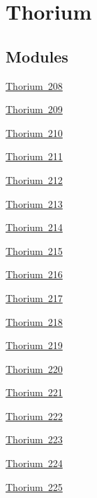 \hypertarget{group___isotope_const-_thorium}{}\section{Thorium}
\label{group___isotope_const-_thorium}
\subsection*{Modules}
\begin{DoxyCompactItemize}
\item 
\mbox{\hyperlink{group___isotope_const-_thorium-_th208}{Thorium 208}}
\item 
\mbox{\hyperlink{group___isotope_const-_thorium-_th209}{Thorium 209}}
\item 
\mbox{\hyperlink{group___isotope_const-_thorium-_th210}{Thorium 210}}
\item 
\mbox{\hyperlink{group___isotope_const-_thorium-_th211}{Thorium 211}}
\item 
\mbox{\hyperlink{group___isotope_const-_thorium-_th212}{Thorium 212}}
\item 
\mbox{\hyperlink{group___isotope_const-_thorium-_th213}{Thorium 213}}
\item 
\mbox{\hyperlink{group___isotope_const-_thorium-_th214}{Thorium 214}}
\item 
\mbox{\hyperlink{group___isotope_const-_thorium-_th215}{Thorium 215}}
\item 
\mbox{\hyperlink{group___isotope_const-_thorium-_th216}{Thorium 216}}
\item 
\mbox{\hyperlink{group___isotope_const-_thorium-_th217}{Thorium 217}}
\item 
\mbox{\hyperlink{group___isotope_const-_thorium-_th218}{Thorium 218}}
\item 
\mbox{\hyperlink{group___isotope_const-_thorium-_th219}{Thorium 219}}
\item 
\mbox{\hyperlink{group___isotope_const-_thorium-_th220}{Thorium 220}}
\item 
\mbox{\hyperlink{group___isotope_const-_thorium-_th221}{Thorium 221}}
\item 
\mbox{\hyperlink{group___isotope_const-_thorium-_th222}{Thorium 222}}
\item 
\mbox{\hyperlink{group___isotope_const-_thorium-_th223}{Thorium 223}}
\item 
\mbox{\hyperlink{group___isotope_const-_thorium-_th224}{Thorium 224}}
\item 
\mbox{\hyperlink{group___isotope_const-_thorium-_th225}{Thorium 225}}

\end{DoxyCompactItemize}
